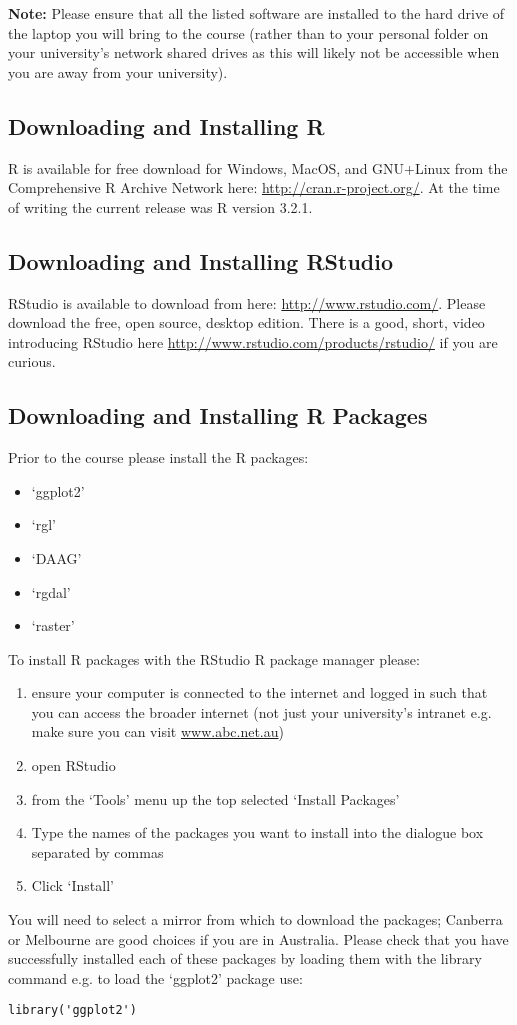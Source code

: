 \documentclass{article}[12pt]
\begin{document}
\textbf{Note:} Please ensure that all the listed software are installed to the hard drive of the laptop you will bring to the course (rather than to your personal folder on your university's network shared drives as this will likely not be accessible when you are away from your university).

\subsection*{Downloading and Installing R}
R is available for free download for Windows, MacOS, and GNU+Linux from the Comprehensive R Archive Network here: \url{http://cran.r-project.org/}.  At the time of writing the current release was R version 3.2.1.

\subsection*{Downloading and Installing RStudio}
RStudio is available to download from here: \url{http://www.rstudio.com/}.
Please download the free, open source, desktop edition.
There is a good, short, video introducing RStudio here \url{http://www.rstudio.com/products/rstudio/} if you are curious.

\subsection*{Downloading and Installing R Packages}
Prior to the course please install the R packages: \begin{itemize}
 \item `ggplot2'
 \item `rgl'
 \item `DAAG'
 \item `rgdal'
 \item `raster'
\end{itemize}

To install R packages with the RStudio R package manager please: \begin{enumerate}
\item ensure your computer is connected to the internet and logged in such that you can access the broader internet (not just your university's intranet e.g. make sure you can visit \url{www.abc.net.au})
\item open RStudio
\item from the `Tools' menu up the top selected `Install Packages'
\item Type the names of the packages you want to install into the dialogue box separated by commas
\item Click `Install'
\end{enumerate}
You will need to select a mirror from which to download the packages; Canberra or Melbourne are good choices if you are in Australia.
Please check that you have successfully installed each of these packages by loading them with the library command e.g. to load the `ggplot2' package use:
\begin{verbatim}
library('ggplot2')
\end{verbatim}
\end{document}
